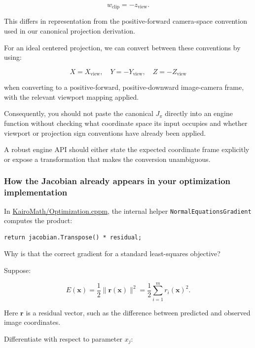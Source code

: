\[
w_{\text{clip}}=-z_{\text{view}}.
\]

This differs in representation from the positive-forward camera-space convention used in our canonical projection derivation.

For an ideal centered projection, we can convert between these conventions by using:

\[
X=X_{\text{view}},\quad Y=-Y_{\text{view}},\quad Z=-Z_{\text{view}}
\]

when converting to a positive-forward, positive-downward image-camera frame, with the relevant viewport mapping applied.

Consequently, you should not paste the canonical \(J_\pi\) directly into an engine function without checking what coordinate space its input occupies and whether viewport or projection sign conventions have already been applied.

A robust engine API should either state the expected coordinate frame explicitly or expose a transformation that makes the conversion unambiguous.

\subsubsection{How the Jacobian already appears in your optimization implementation}\label{02-foundations-ii-ch021-how-the-jacobian-already-appears-in-your-optimization-implementation}

\hypertarget{02-foundations-ii-ch021-how-the-jacobian-already-appears-in-your-optimization-implementation}{}

In \href{https://github.com/swayam8624/KairoMath/blob/master/Optimization.cppm?utm_source=chatgpt.com}{KairoMath/Optimization.cppm}, the internal helper \texttt{NormalEquationsGradient} computes the product:

\begin{verbatim}
return jacobian.Transpose() * residual;
\end{verbatim}

Why is that the correct gradient for a standard least-squares objective?

Suppose:

\[
E(\mathbf x)=\frac12\|\mathbf r(\mathbf x)\|^2 =\frac12\sum_{i=1}^m r_i(\mathbf x)^2.
\]

Here \(\mathbf r\) is a residual vector, such as the difference between predicted and observed image coordinates.

Differentiate with respect to parameter \(x_j\):

